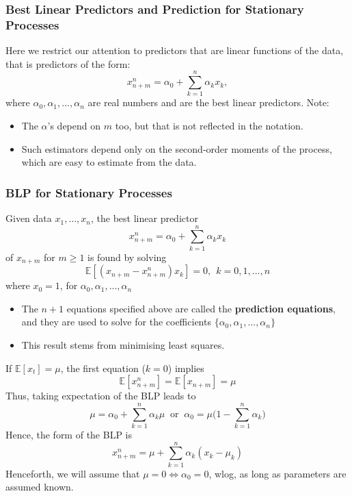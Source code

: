 \documentclass[11pt]{article}
\newcommand{\noi}{\noindent}
\begin{document}
\subsubsection{Best Linear Predictors and Prediction for Stationary Processes}
\noi Here we restrict our attention to predictors that are linear functions of the data, that is predictors of the form:
$$x_{n+m}^n = \alpha_0 + \sum_{k=1}^{n}\alpha_kx_k,$$
\noi where $\alpha_0, \alpha_1, ..., \alpha_n$ are real numbers and are the best linear predictors. Note:
\begin{itemize}
    \item The $\alpha$'s depend on $m$ too, but that is not reflected in the notation.
    \item Such estimators depend only on the second-order moments of the process, which are easy to estimate from the data.
\end{itemize} \phantom{i}

\subsubsection*{BLP for Stationary Processes}
\noi Given data $x_1, ..., x_n$, the best linear predictor
$$x_{n+m}^n = \alpha_0 + \sum_{k=1}^{n}{\alpha_k x_k}$$
\noi of $x_{n+m}$ for $m \geq 1$ is found by solving
$$\mathbb{E}[(x_{n+m} - x_{n+m}^n)x_k] = 0, \: \: k=0,1,...,n$$
\noi where $x_0 = 1$, for $\alpha_0, \alpha_1, ..., \alpha_n$
\begin{itemize}
    \item The $n + 1$ equations specified above are called the \textbf{prediction equations}, and they are used to solve for the coefficients $\{\alpha_0, \alpha_1,..., \alpha_n\}$
    \item This result stems from minimising least squares.
\end{itemize} \phantom{i}

If $\mathbb{E}[x_t] = \mu$, the first equation ($k=0$) implies
$$\mathbb{E}[x_{n+m}^n] = \mathbb{E}[x_{n+m}] = \mu$$
\noi Thus, taking expectation of the BLP leads to
$$\mu = \alpha_0 + \sum_{k=1}^{n}{\alpha_k \mu} \: \text{ or } \: \alpha_0 = \mu\Big( 1 - \sum_{k=1}^{n}\alpha_k \Big)$$
\noi Hence, the form of the BLP is
$$x_{n+m}^n = \mu + \sum_{k=1}^{n}\alpha_k(x_k - \mu_k)$$
\noi Henceforth, we will assume that $\mu = 0 \Leftrightarrow \alpha_0 = 0$, wlog, as long as parameters are assumed known.
\end{document}

